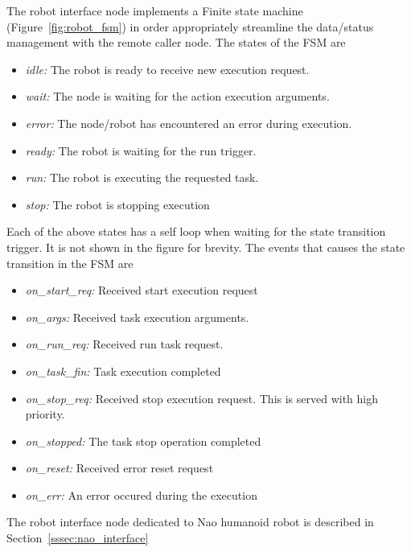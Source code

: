 The robot interface node implements a Finite state machine (Figure~\ref{fig:robot_fsm}) in order appropriately streamline the data/status management with the remote caller node. The states of the FSM are
\begin{itemize}
\item \emph{idle:} The robot is ready to receive new execution request.
\item \emph{wait:} The node is waiting for the action execution arguments.
\item \emph{error:} The node/robot has encountered an error during execution.
\item \emph{ready:} The robot is waiting for the run trigger.
\item \emph{run:} The robot is executing the requested task.
\item \emph{stop:} The robot is stopping execution
\end{itemize}
Each of the above states has a self loop when waiting for the state transition trigger. It is not shown in the figure for brevity. The events that causes the state transition in the FSM are
\begin{itemize}
\item \emph{on\_start\_req:} Received start execution request
\item \emph{on\_args:} Received task execution arguments.
\item \emph{on\_run\_req:} Received run task request.
\item \emph{on\_task\_fin:} Task execution completed
\item \emph{on\_stop\_req:} Received stop execution request. This is served with high priority.
\item \emph{on\_stopped:} The task stop operation completed
\item \emph{on\_reset:} Received error reset request
\item \emph{on\_err:} An error occured during the execution
\end{itemize}
The robot interface node dedicated to Nao humanoid robot is described in Section~\ref{sssec:nao_interface}
